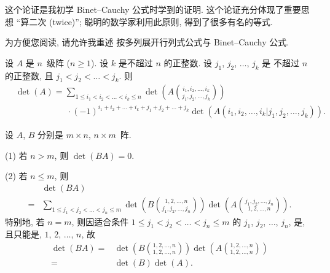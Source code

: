 \documentclass[%
    UTF8,%
    fontset=none,%
    punct=kaiming,%
    zihao=-4,%
    a4paper,%
    oneside,%
]{ctexbook}
\renewcommand*{\leq}{\leqslant}
\renewcommand*{\geq}{\geqslant}
\begin{document}
这个论证是我初学 Binet--Cauchy 公式时学到的证明.
这个论证充分体现了重要思想 ``算二次 (twice)'';
聪明的数学家利用此原则, 得到了很多有名的等式.

为方便您阅读, 请允许我重述%
按多列展开行列式公式与 Binet--Cauchy 公式.

\begin{theorem}
    设 \(A\) 是 \(n\)~级阵 (\(n \geq 1\)).
    设 \(k\) 是不超过 \(n\) 的正整数.
    设 \(j_1\), \(j_2\), \(\dots\), \(j_k\) 是%
    不超过 \(n\) 的正整数,
    且 \(j_1 < j_2 < \dots < j_k\).
    则
    \begin{align*}
         &
        \det {(A)}
        = \sum_{1 \leq i_1 < i_2 < \dots < i_k \leq n}
        {\det {\left(
                A\binom{i_1, i_2, \dots, i_k}
                {j_1, j_2, \dots, j_k}
                \right)}}
        \\
         &
        \qquad \qquad \qquad
        \cdot (-1)^{i_1 + i_2 + \dots + i_k
            + j_1 + j_2 + \dots + j_k}
        \det {(A({i_1,i_2,\dots,i_k}|{j_1,j_2,\dots,j_k}))}.
    \end{align*}
\end{theorem}

\begin{theorem}
    设 \(A\), \(B\) 分别是 \(m \times n\), \(n \times m\)~阵.

    (1)
    若 \(n > m\), 则 \(\det {(BA)} = 0\).

    (2)
    若 \(n \leq m\),
    则
    \begin{align*}
             & \det {(BA)}
        \\
        = {} & \sum_{1 \leq j_1 < j_2 < \dots < j_n \leq m}
        {
            \det {\left(
                B\binom{1, 2, \dots, n}{j_1, j_2, \dots, j_n}
                \right)}
            \det {\left(
                A\binom{j_1, j_2, \dots, j_n}{1, 2, \dots, n}
                \right)}
        }.
    \end{align*}
    特别地, 若 \(n = m\), 则因适合条件
    \(1 \leq j_1 < j_2 < \dots < j_n \leq m\)
    的 \(j_1\), \(j_2\), \(\dots\), \(j_n\),
    是, 且只能是,
    \(1\), \(2\), \(\dots\), \(n\),
    故
    \begin{align*}
        \det {(BA)}
        = {} &
        \det {\left(
            B\binom{1, 2, \dots, n}{1, 2, \dots, n}
            \right)}
        \det {\left(
            A\binom{1, 2, \dots, n}{1, 2, \dots, n}
            \right)}
        \\
        = {} & \det {(B)} \det {(A)}.
    \end{align*}
\end{theorem}
\end{document}
